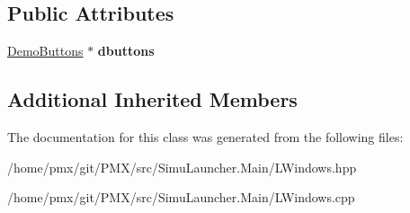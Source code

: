 \subsection*{Public Attributes}
\begin{DoxyCompactItemize}
\item 
\mbox{\label{classSecondWindow_a00ad9ea7c13b9d75a926274ba9d7d784}} 
\hyperlink{classDemoButtons}{Demo\+Buttons} $\ast$ {\bfseries dbuttons}
\end{DoxyCompactItemize}
\subsection*{Additional Inherited Members}


The documentation for this class was generated from the following files\+:\begin{DoxyCompactItemize}
\item 
/home/pmx/git/\+P\+M\+X/src/\+Simu\+Launcher.\+Main/L\+Windows.\+hpp\item 
/home/pmx/git/\+P\+M\+X/src/\+Simu\+Launcher.\+Main/L\+Windows.\+cpp\end{DoxyCompactItemize}
